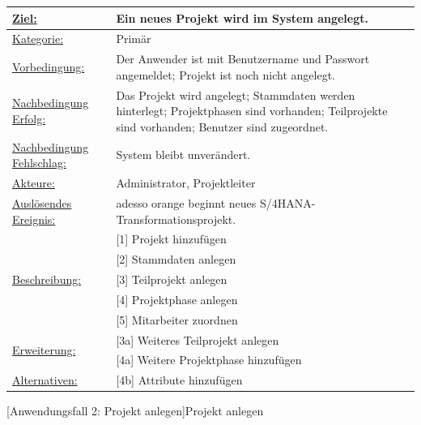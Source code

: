 \label{tab:UC2}
\begin{tabularx}{\textwidth}{|p{}|p{}|}
        \hline
        \underline{Ziel:} & Ein neues Projekt wird im System angelegt.\\\hline
        \underline{Kategorie:} & Primär\\\hline
        \underline{Vorbedingung:} & Der Anwender ist mit Benutzername und Passwort angemeldet; Projekt ist noch nicht angelegt.\\\hline
        \underline{Nachbedingung Erfolg:} & Das Projekt wird angelegt; Stammdaten werden hinterlegt; Projektphasen sind vorhanden; Teilprojekte sind vorhanden; Benutzer sind zugeordnet.\\\hline
        \underline{Nachbedingung Fehlschlag:} & System bleibt unverändert.\\\hline
        \underline{Akteure:} & Administrator, Projektleiter\\\hline
        \underline{Auslösendes Ereignis:} & adesso orange beginnt neues S/4HANA-Transformationsprojekt.\\\hline        
        \multirow{5}{*}{\underline{Beschreibung:}} & [1] Projekt hinzufügen\\
        & [2] Stammdaten anlegen\\
        & [3] Teilprojekt anlegen\\
        & [4] Projektphase anlegen\\
        & [5] Mitarbeiter zuordnen\\\hline
        \multirow{2}{*}{\underline{Erweiterung:}} & [3a] Weiteres Teilprojekt anlegen\\
        & [4a] Weitere Projektphase hinzufügen\\\hline
        \underline{Alternativen:} & [4b] Attribute hinzufügen\\\hline
\end{tabularx}
[Anwendungsfall 2: Projekt anlegen]{Projekt anlegen}


